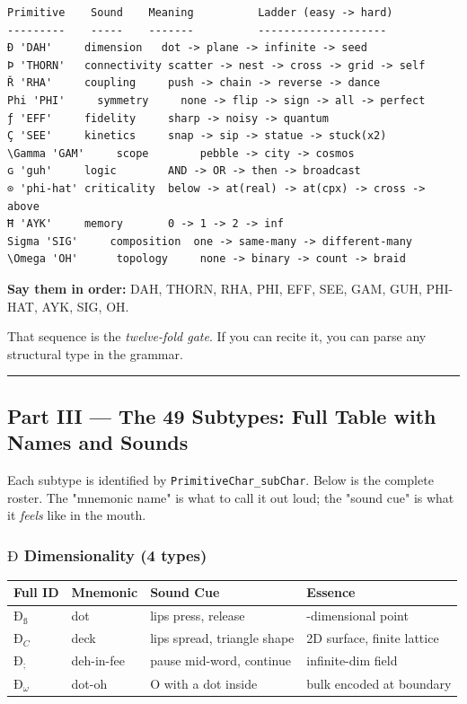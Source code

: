 \documentclass[12pt,a4paper]{article}
\begin{document}
\begin{lstlisting}
Primitive    Sound    Meaning          Ladder (easy -> hard)
---------    -----    -------          --------------------
Ð 'DAH'     dimension   dot -> plane -> infinite -> seed
Þ 'THORN'   connectivity scatter -> nest -> cross -> grid -> self
Ř 'RHA'     coupling     push -> chain -> reverse -> dance
Phi 'PHI'     symmetry     none -> flip -> sign -> all -> perfect
ƒ 'EFF'     fidelity     sharp -> noisy -> quantum
Ç 'SEE'     kinetics     snap -> sip -> statue -> stuck(x2)
\Gamma 'GAM'     scope        pebble -> city -> cosmos
ɢ 'guh'     logic        AND -> OR -> then -> broadcast
⊙ 'phi-hat' criticality  below -> at(real) -> at(cpx) -> cross -> above
Ħ 'AYK'     memory       0 -> 1 -> 2 -> inf
Sigma 'SIG'     composition  one -> same-many -> different-many
\Omega 'OH'      topology     none -> binary -> count -> braid
\end{lstlisting}

\textbf{Say them in order:} DAH, THORN, RHA, PHI, EFF, SEE, GAM, GUH, PHI-HAT, AYK, SIG, OH.

That sequence is the \emph{twelve-fold gate}. If you can recite it, you can parse any structural type in the grammar.

\begin{center}
\rule{0.5\textwidth}{0.4pt}
\end{center}

\subsection{Part III --- The 49 Subtypes: Full Table with Names and Sounds}

Each subtype is identified by \texttt{PrimitiveChar\_subChar}. Below is the complete roster. The "mnemonic name" is what to call it out loud; the "sound cue" is what it \emph{feels} like in the mouth.

\subsubsection{$Ð$ Dimensionality (4 types)}

\begin{table}[htbp]
\centering
\small
{}
\begin{tabularx}{\textwidth}{>{\centering\arraybackslash}X >{\centering\arraybackslash}X >{\centering\arraybackslash}X >{\centering\arraybackslash}X}
\toprule
\rowcolor{gray!25}\textbf{Full ID} & \textbf{Mnemonic} & \textbf{Sound Cue} & \textbf{Essence} \\
\midrule
\rowcolors{1}{white}{gray!10}
$Ð_{ß}$ & dot & lips press, release & 0-dimensional point \\
$Ð_{C}$ & deck & lips spread, triangle shape & 2D surface, finite lattice \\
$Ð_{;}$ & deh-in-fee & pause mid-word, continue & infinite-dim field \\
$Ð_{\omega}$ & dot-oh & O with a dot inside & bulk encoded at boundary \\
\bottomrule
\end{tabularx}
\end{table}
\end{document}
